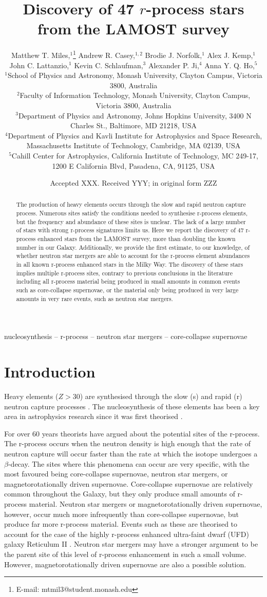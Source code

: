 \documentclass[a4paper,fleqn,usenatbib]{mnras}
\title[Discovery of 47 r-process stars from the LAMOST survey]{Discovery of 47 $r$-process stars from the LAMOST survey}
\author[Matthew T. Miles et al.]{Matthew T. Miles,$^{1}$\thanks{E-mail: mtmil3@student.monash.edu}
	Andrew R. Casey,$^{1,2}$
	Brodie J. Norfolk,$^{1}$
	Alex J. Kemp,$^{1}$\newauthor
	John C. Lattanzio,$^{1}$
	Kevin C. Schlaufman,$^{3}$
	Alexander P. Ji,$^{4}$
	Anna Y. Q. Ho,$^{5}$
	\\
	$^{1}$School of Physics and Astronomy, Monash University, Clayton Campus, Victoria 3800, Australia\\
	$^{2}$Faculty of Information Technology, Monash University, Clayton Campus, Victoria 3800, Australia\\
	$^{3}$Department of Physics and Astronomy, Johns Hopkins University, 3400 N Charles St., Baltimore, MD 21218, USA\\
	$^{4}$Department of Physics and Kavli Institute for Astrophysics and Space Research, Massachusetts Institute of Technology, Cambridge, MA 02139, USA\\
	$^{5}$Cahill Center for Astrophysics, California Institute of Technology, MC 249-17, 1200 E California Blvd, Pasadena, CA, 91125, USA
}
\date{Accepted XXX. Received YYY; in original form ZZZ}
\begin{document}
	\label{firstpage}
	\pagerange{\pageref{firstpage}--\pageref{lastpage}}
	\maketitle
	
	\begin{abstract}
		The production of heavy elements occurs through the slow and rapid neutron capture process. Numerous sites satisfy the conditions needed to synthesise r-process elements, but the frequency and abundance of these sites is unclear. The lack of a large number of stars with strong r-process signatures limits us. Here we report the discovery of 47 r-process enhanced stars from the LAMOST survey, more than doubling the known number in our Galaxy. Additionally, we provide the first estimate, to our knowledge, of whether neutron star mergers are able to account for the r-process element abundances in all known r-process enhanced stars in the Milky Way. The discovery of these stars implies multiple r-process sites, contrary to previous conclusions in the literature including all r-process material being produced in small amounts in common events such as core-collapse supernovae, or the material only being produced in very large amounts in very rare events, such as neutron star mergers. 
	\end{abstract}
	
	\begin{keywords}
		nucleosynthesis -- r-process -- neutron star mergers -- core-collapse supernovae
	\end{keywords}
	
	
	\section{Introduction}
	
	Heavy elements ($Z > 30$) are synthesised through the slow (s) and rapid (r) neutron capture processes \citep{Sneden2008}. The nucleosynthesis of these elements has been a key area in astrophysics research since it was first theorised  \citep{Burbidge1957}.
	
	For over 60 years theorists have argued about the potential sites of the r-process. The r-process occurs when the neutron density is high enough that the rate of neutron capture will occur faster than the rate at which the isotope undergoes a $\beta$-decay. The sites where this phenomena can occur are very specific, with the most favoured being core-collapse supernovae, neutron star mergers, or magnetorotationally driven supernovae. Core-collapse supernovae are relatively common throughout the Galaxy, but they only produce small amounts of r-process material. Neutron star mergers or magnetorotationally driven supernovae, however, occur much more infrequently than core-collapse supernovae, but produce far more r-process material. Events such as these are theorised to account for the case of the highly r-process enhanced ultra-faint dwarf (UFD) galaxy Reticulum II \citep{Ji2016}. Neutron star mergers may have a stronger argument to be the parent site of this level of r-process enhancement in such a small volume. However, magnetorotationally driven supernovae are also a possible solution.
\end{document}
